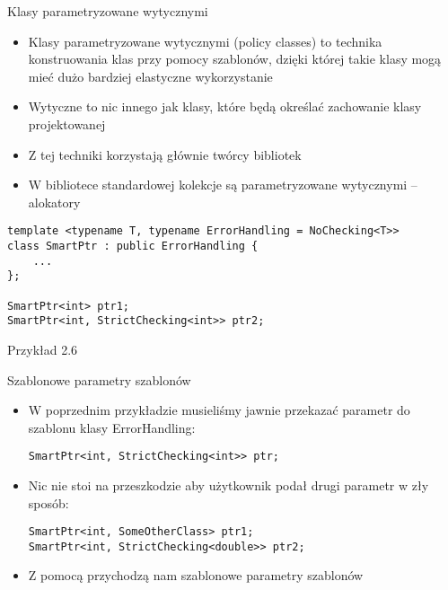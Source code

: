 \documentclass[11pt]{beamer}
\begin{document}
\begin{frame}[fragile]{Klasy parametryzowane wytycznymi}
    \begin{itemize}
        \item Klasy parametryzowane wytycznymi (policy classes) to technika konstruowania klas przy pomocy szablonów, dzięki której takie klasy mogą mieć dużo bardziej elastyczne wykorzystanie
        \item Wytyczne to nic innego jak klasy, które będą określać zachowanie klasy projektowanej
        \item Z tej techniki korzystają głównie twórcy bibliotek
        \item W bibliotece standardowej kolekcje są parametryzowane wytycznymi -- alokatory
    \end{itemize}
    \begin{lstlisting}[frame=single, basicstyle=\tiny]
template <typename T, typename ErrorHandling = NoChecking<T>>
class SmartPtr : public ErrorHandling {
    ...
};

SmartPtr<int> ptr1;
SmartPtr<int, StrictChecking<int>> ptr2;
    \end{lstlisting}
    \alert{Przykład 2.6}
\end{frame}

\begin{frame}[fragile]{Szablonowe parametry szablonów}
    \begin{itemize}
        \item W poprzednim przykładzie musieliśmy jawnie przekazać parametr do szablonu klasy ErrorHandling:
        \begin{lstlisting}[frame=single]
SmartPtr<int, StrictChecking<int>> ptr;
    \end{lstlisting}
        \item Nic nie stoi na przeszkodzie aby użytkownik podał drugi parametr w zły sposób:
        \begin{lstlisting}[frame=single]
SmartPtr<int, SomeOtherClass> ptr1;
SmartPtr<int, StrictChecking<double>> ptr2;
    \end{lstlisting}
        \item Z pomocą przychodzą nam szablonowe parametry szablonów
    \end{itemize}
\end{frame}
\end{document}
